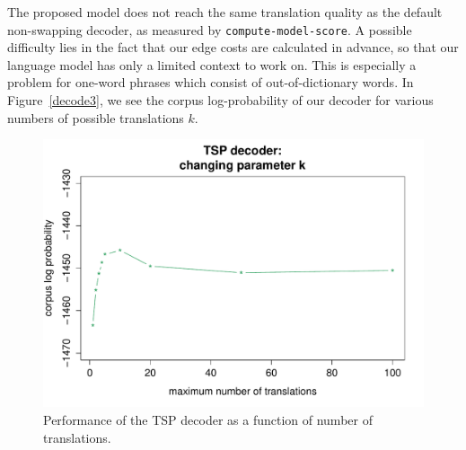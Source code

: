 The proposed model does not reach the same translation quality as the
default non-swapping decoder, as measured by \texttt{compute-model-score}.
A possible difficulty lies in the fact that our edge costs are calculated in
advance, so that our language model has only a limited context to work on.
This is especially a problem for one-word phrases which consist of
out-of-dictionary words. In Figure~\ref{decode3}, we see the corpus
log-probability of our decoder for various numbers of possible translations
$k$.

\begin{figure}
	\centering
	\includegraphics[scale=.5]{figures/TSP_k.pdf}
	\caption{Performance of the TSP decoder as a function of number of translations.}\label{swap}
\end{figure}
